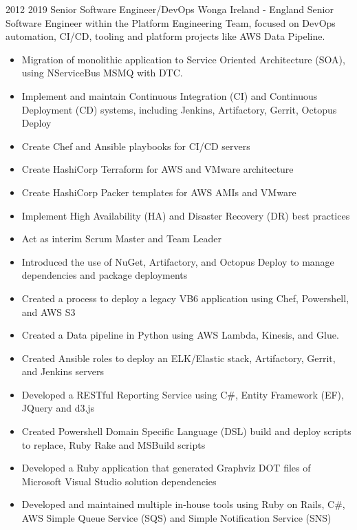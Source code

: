 \vspace{0.25\baselineskip}
\begin{twenty}
\twentyitem
  {2012}
  {2019}
  {Senior Software Engineer/DevOps}
  {Wonga}
  {Ireland - England}
  {Senior Software Engineer within the Platform Engineering Team, focused on DevOps automation, CI/CD, tooling and platform projects like AWS Data Pipeline.}
  {\begin{itemize}
    \item Migration of monolithic application to Service Oriented Architecture (SOA), using NServiceBus MSMQ with DTC.
    \item Implement and maintain Continuous Integration (CI) and Continuous Deployment (CD) systems, including Jenkins, Artifactory, Gerrit, Octopus Deploy
    \item Create Chef and Ansible playbooks for CI/CD servers
    \item Create HashiCorp Terraform for AWS and VMware architecture
    \item Create HashiCorp Packer templates for AWS AMIs and VMware
    \item Implement High Availability (HA) and Disaster Recovery (DR) best practices
    \item Act as interim Scrum Master and Team Leader
  \end{itemize}
  }
  {\begin{itemize}
    \item Introduced the use of NuGet, Artifactory, and Octopus Deploy to manage dependencies and package deployments
    \item Created a process to deploy a legacy VB6 application using Chef, Powershell, and AWS S3
    \item Created a Data pipeline in Python using AWS Lambda, Kinesis, and Glue.
    \item Created Ansible roles to deploy an ELK/Elastic stack, Artifactory, Gerrit, and Jenkins servers
    \item Developed a RESTful Reporting Service using C\#, Entity Framework (EF), JQuery and d3.js
    \item Created Powershell Domain Specific Language (DSL) build and deploy scripts to replace, Ruby Rake and MSBuild scripts
    \item Developed a Ruby application that generated Graphviz DOT files of Microsoft Visual Studio solution dependencies
    \item Developed and maintained multiple in-house tools using Ruby on Rails, C\#, AWS Simple Queue Service (SQS) and Simple Notification Service (SNS)
  \end{itemize}
  }
\end{twenty}

\vspace{0.25\baselineskip}
